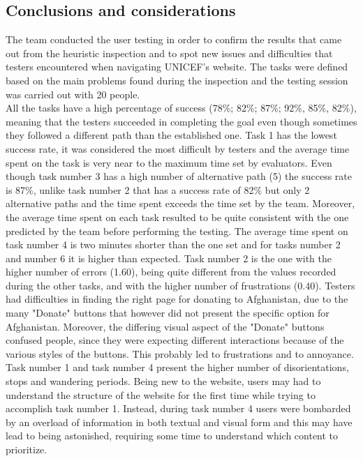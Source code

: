 
\subsection{Conclusions and considerations}

The team conducted the user testing in order to confirm the results that came out from the heuristic inspection and to spot new issues and difficulties that testers encountered when navigating UNICEF’s website. The tasks were defined based on the main problems found during the inspection and the testing session was carried out with 20 people.\\

All the tasks have a high percentage of success (78\%; 82\%; 87\%; 92\%, 85\%, 82\%), meaning that the testers succeeded in completing the goal even though sometimes they followed a different path than the established one. Task 1 has the lowest success rate, it was considered the most difficult by testers and the average time spent on the task is very near to the maximum time set by evaluators. Even though task number 3 has a high number of alternative path (5) the success rate is 87\%, unlike task number 2 that has a success rate of 82\% but only 2 alternative paths and the time spent exceeds the time set by the team.
Moreover, the average time spent on each task resulted to be quite consistent with the one predicted by the team before performing the testing. The average time spent on task number 4 is two minutes shorter than the one set and for tasks number 2 and number 6 it is higher than expected.
Task number 2 is the one with the higher number of errors (1.60), being quite different from the values recorded during the other tasks, and with the higher number of frustrations (0.40). Testers had difficulties in finding the right page for donating to Afghanistan, due to the many "Donate" buttons that however did not present the specific option for Afghanistan. Moreover, the differing visual aspect of the "Donate" buttons confused people, since they were expecting different interactions because of the various styles of the buttons. This probably led to frustrations and to annoyance.
Task number 1 and task number 4 present the higher number of disorientations, stops and wandering periods. Being new to the website, users may had to understand the structure of the website for the first time while trying to accomplish task number 1. Instead, during task number 4 users were bombarded by an overload of information in both textual and visual form and this may have lead to being astonished, requiring some time to understand which content to prioritize.


